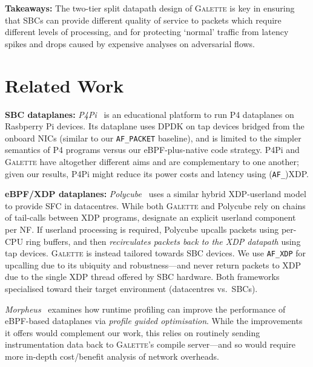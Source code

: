 \documentclass[comsoc, conference, times]{IEEEtran}
\newcommand{\ourtech}{\textsc{Galette}}
\newcommand{\afxdp}{\texttt{AF\_XDP}}
\newcommand{\af}{(\texttt{AF\_})XDP}
\newcommand{\afp}{\texttt{AF\_PACKET}}
\newcommand{\fakepara}[1]{\noindent\textbf{#1:}}
\begin{document}
\fakepara{Takeaways}
The two-tier split datapath design of \ourtech{} is key in ensuring that SBCs can provide different quality of service to packets which require different levels of processing, and for protecting `normal' traffic from latency spikes and drops caused by expensive analyses on adversarial flows.

\section{Related Work}\label{sec:related}

\fakepara{SBC dataplanes}
\emph{P4Pi}~\parencite{DBLP:journals/ccr/LakiSKSVZ21} is an educational platform to run P4 dataplanes on Rasbperry Pi devices.
Its dataplane uses DPDK on tap devices bridged from the onboard NICs (similar to our \afp{} baseline), and is limited to the simpler semantics of P4 programs versus our eBPF-plus-native code strategy.
P4Pi and \ourtech{} have altogether different aims and are complementary to one another; given our results, P4Pi might reduce its power costs and latency using \af{}.

\fakepara{eBPF/XDP dataplanes}
\emph{Polycube}~\parencite{DBLP:journals/tnsm/MianoRBBL21} uses a similar hybrid XDP-userland model to provide SFC in datacentres.
While both \ourtech{} and Polycube rely on chains of tail-calls between XDP programs, \citeauthor{DBLP:journals/tnsm/MianoRBBL21} designate an explicit userland component per NF.
If userland processing is required, Polycube upcalls packets using per-CPU ring buffers, and then \emph{recirculates packets back to the XDP datapath} using tap devices.
\ourtech{} is instead tailored towards SBC devices.
We use \afxdp{} for upcalling due to its ubiquity and robustness---and never return packets to XDP due to the single XDP thread offered by SBC hardware.
Both frameworks specialised toward their target environment (datacentres vs.\ SBCs).

\emph{Morpheus}~\parencite{DBLP:conf/asplos/MianoSRRA22} examines how runtime profiling can improve the performance of eBPF-based dataplanes via \emph{profile guided optimisation}.
While the improvements it offers would complement our work, this relies on routinely sending instrumentation data back to \ourtech{}'s compile server---and so would require more in-depth cost/benefit analysis of network overheads.

%
\end{document}
